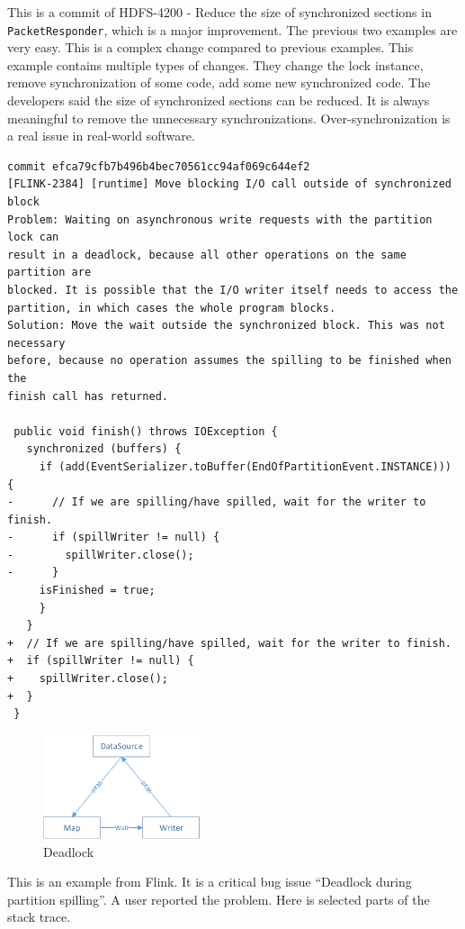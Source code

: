 \documentclass[conference]{IEEEtran}
\begin{document}
This is a commit of HDFS-4200 - Reduce the size of synchronized sections in \texttt{PacketResponder}, which is a major improvement. The previous two examples are very easy. This is a complex change compared to previous examples. This example contains multiple types of changes. They change the lock instance, remove synchronization of some code, add some new synchronized code. The developers said the size of synchronized sections can be reduced. It is always meaningful to remove the unnecessary synchronizations. Over-synchronization \cite{conf/sigsoft/GuJSZL15} is a real issue in real-world software.

\begin{lstlisting}
commit efca79cfb7b496b4bec70561cc94af069c644ef2
[FLINK-2384] [runtime] Move blocking I/O call outside of synchronized block
Problem: Waiting on asynchronous write requests with the partition lock can
result in a deadlock, because all other operations on the same partition are
blocked. It is possible that the I/O writer itself needs to access the
partition, in which cases the whole program blocks.
Solution: Move the wait outside the synchronized block. This was not necessary
before, because no operation assumes the spilling to be finished when the
finish call has returned.

 public void finish() throws IOException {
   synchronized (buffers) {
     if (add(EventSerializer.toBuffer(EndOfPartitionEvent.INSTANCE))) {
-      // If we are spilling/have spilled, wait for the writer to finish.
-      if (spillWriter != null) {
-        spillWriter.close();
-      }
     isFinished = true;
     }
   }
+  // If we are spilling/have spilled, wait for the writer to finish.
+  if (spillWriter != null) {
+    spillWriter.close();
+  }
 }
\end{lstlisting}

\begin{figure}
	\centering
	\includegraphics[height=1.2in]{deadlock}
	\caption{Deadlock}
\end{figure}

This is an example from Flink. It is a critical bug issue ``Deadlock during partition spilling''. A user reported the problem. Here is selected parts of the stack trace.
\end{document}
